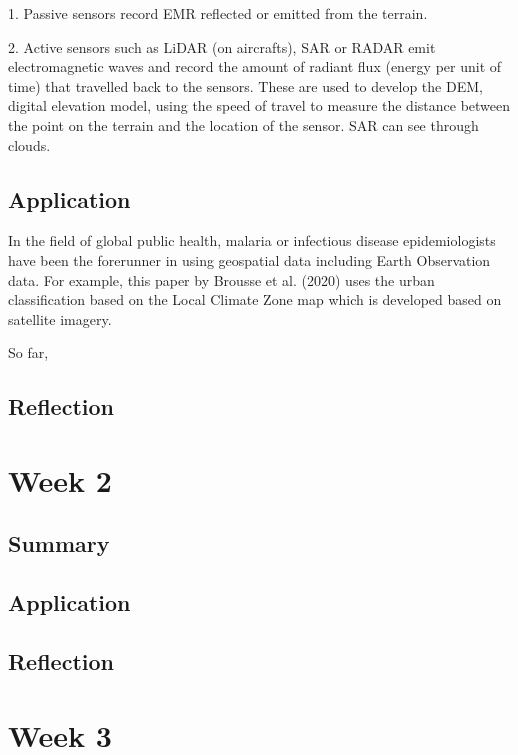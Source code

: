 \documentclass[
  letterpaper,
  DIV=11,
  numbers=noendperiod]{scrreprt}
\begin{document}
1. Passive sensors record EMR reflected or emitted from the terrain.

2. Active sensors such as LiDAR (on aircrafts), SAR or RADAR emit
electromagnetic waves and record the amount of radiant flux (energy per
unit of time) that travelled back to the sensors. These are used to
develop the DEM, digital elevation model, using the speed of travel to
measure the distance between the point on the terrain and the location
of the sensor. SAR can see through clouds.

\hypertarget{application}{%
\section{Application}\label{application}}

In the field of global public health, malaria or infectious disease
epidemiologists have been the forerunner in using geospatial data
including Earth Observation data. For example, this paper by Brousse et
al. (2020) uses the urban classification based on the Local Climate Zone
map which is developed based on satellite imagery.

So far,

\hypertarget{reflection}{%
\section{Reflection}\label{reflection}}

\hypertarget{week-2}{%
\chapter{Week 2}\label{week-2}}

\hypertarget{summary-1}{%
\section{Summary}\label{summary-1}}

\hypertarget{application-1}{%
\section{Application}\label{application-1}}

\hypertarget{reflection-1}{%
\section{Reflection}\label{reflection-1}}

\hypertarget{week-3}{%
\chapter{Week 3}\label{week-3}}
\end{document}
